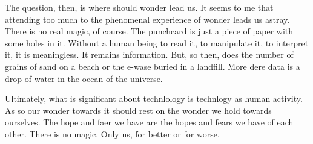 \documentclass{article}
\begin{document}
The question, then, is where should wonder lead us.
It seems to me that attending too much to the phenomenal experience of wonder
leads us astray.
There is no real magic, of course.
The punchcard is just a piece of paper with some holes in it.
Without a human being to read it, to manipulate it, to interpret it, it is
meaningless.
It remains information.
But, so then, does the number of grains of sand on a beach or the e-wase buried
in a landfill.
More dere data is a drop of water in the ocean of the universe.

Ultimately, what is significant about technlology is technlogy as human
activity.
As so our wonder towards it should rest on the wonder we hold towards ourselves.
The hope and faer we have are the hopes and fears we have of each other.
There is no magic.
Only us, for better or for worse.
\end{document}
